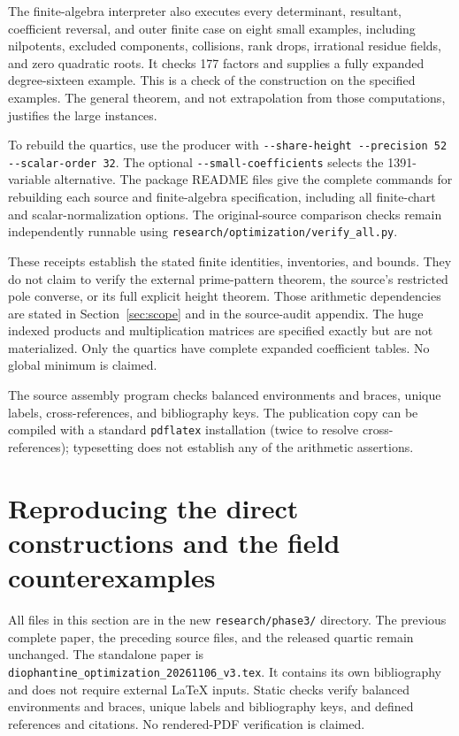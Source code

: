 \documentclass[11pt]{article}
\theoremstyle{definition}
\begin{document}
The finite-algebra interpreter also executes every determinant,
resultant, coefficient reversal, and outer finite case on eight small
examples, including nilpotents, excluded components, collisions,
rank drops, irrational residue fields, and zero quadratic roots. It
checks 177 factors and supplies a fully expanded degree-sixteen
example. This is a check of the construction on the specified examples.
The general theorem, and not extrapolation from those computations,
justifies the large instances.

To rebuild the quartics, use the producer with
\nolinkurl{--share-height --precision 52 --scalar-order 32}.
The optional \nolinkurl{--small-coefficients} selects the
1391-variable alternative. The package README files give the complete
commands for rebuilding each source and finite-algebra specification,
including all finite-chart and scalar-normalization options.
The original-source comparison checks remain independently runnable
using \nolinkurl{research/optimization/verify_all.py}.

These receipts establish the stated finite identities, inventories,
and bounds. They do not claim to verify the external prime-pattern
theorem, the source's restricted pole converse, or its full explicit
height theorem. Those arithmetic dependencies are stated in
Section~\ref{sec:scope} and in the source-audit appendix.
The huge indexed products and multiplication matrices are specified
exactly but are not materialized. Only the quartics have complete
expanded coefficient tables. No global minimum is claimed.

The source assembly program checks balanced environments and braces,
unique labels, cross-references, and bibliography keys. The publication
copy can be compiled with a standard \texttt{pdflatex} installation
(twice to resolve cross-references); typesetting does not establish
any of the arithmetic assertions.


\section{Reproducing the direct constructions and the field counterexamples}
\label{sec:p3-reproduction}

All files in this section are in the new
\nolinkurl{research/phase3/} directory. The previous complete paper,
the preceding source files, and the released quartic remain unchanged.
The standalone paper is
\nolinkurl{diophantine_optimization_20261106_v3.tex}.
It contains its own bibliography and does not require external
\LaTeX{} inputs. Static checks verify balanced environments and braces,
unique labels and bibliography keys, and defined references and
citations. No rendered-PDF verification is claimed.
\end{document}
